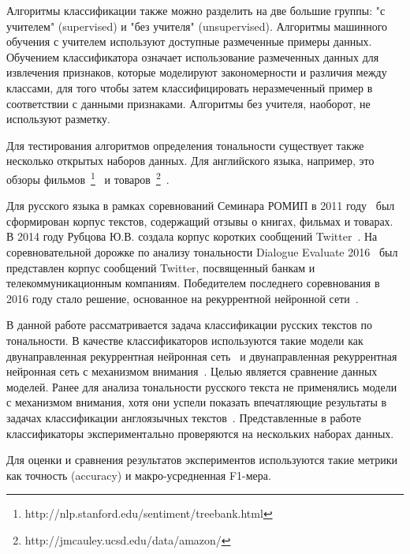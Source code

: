 Алгоритмы классификации также можно разделить на две большие группы: "с учителем" (supervised) и "без учителя" (unsupervised). Алгоритмы машинного обучения с учителем используют доступные размеченные примеры данных. Обучением классификатора означает использование размеченных данных для извлечения признаков, которые моделируют закономерности и различия между классами, для того чтобы затем классифицировать неразмеченный пример в соответствии с данными признаками. Алгоритмы без учителя, наоборот, не используют разметку.

Для тестирования алгоритмов определения тональности существует также несколько открытых наборов данных. Для английского языка, например, это обзоры фильмов~\footnote{http://nlp.stanford.edu/sentiment/treebank.html}~\cite{imdb, socher-rdm} и товаров~\footnote{http://jmcauley.ucsd.edu/data/amazon/}~\cite{amazon}.

Для русского языка в рамках соревнований Семинара РОМИП в 2011 году~\cite{romip} был сформирован корпус текстов, содержащий отзывы о книгах, фильмах и товарах. В 2014 году Рубцова Ю.В. создала корпус коротких сообщений Twitter~\cite{mokoron2015}.
На соревновательной дорожке по анализу тональности Dialogue Evaluate 2016~\cite{senti-ru-eval} был представлен корпус сообщений Twitter, посвященный банкам и телекоммуникационным компаниям. Победителем последнего соревнования в 2016 году стало решение, основанное на рекуррентной нейронной сети~\cite{arhipenko}.

В данной работе рассматривается задача классификации русских текстов по тональности. В качестве классификаторов используются такие модели как двунаправленная рекуррентная нейронная сеть~\cite{schuster} и двунаправленная рекуррентная нейронная сеть с механизмом внимания~\cite{bahdanau}. Целью является сравнение данных моделей. Ранее для анализа тональности русского текста не применялись модели с механизмом внимания, хотя они успели показать впечатляющие результаты в задачах классификации англоязычных текстов~\cite{yang-att-2016}. Представленные в работе классификаторы экспериментально проверяются на нескольких наборах данных.

Для оценки и сравнения результатов экспериментов используются такие метрики как точность (accuracy) и макро-усредненная F1-мера.
